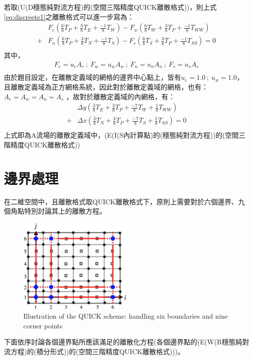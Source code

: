 \documentclass[12pt]{article}
\begin{document}
若取(U(D穩態純對流方程)的(空間三階精度QUICK離散格式))，則上式\eqref{eq:discreete1}之離散格式可以進一步寫為：
\begin{equation}\label{QUICK1}\begin{split}
    &F_{e}(\frac{6}{8}T_{P} + \frac{3}{8}T_{E} + \frac{-1}{8}T_{W}) - F_{w}(\frac{6}{8}T_{W} + \frac{3}{8}T_{P} + \frac{-1}{8}T_{WW}) \\[1.5ex] 
    + &F_{n}(\frac{6}{8}T_{P} + \frac{3}{8}T_{N} + \frac{-1}{8}T_{S}) - F_{s}(\frac{6}{8}T_{S} + \frac{3}{8}T_{P} + \frac{-1}{8}T_{SS}) = 0 \\[1.5ex]
\end{split}\end{equation}
其中，\begin{equation}\begin{split}
    F_{e} = u_{e}A_{e}\ ;\ F_{w} = u_{w}A_{w}\ ;\ F_{n} = u_{n}A_{n}\ ;\ F_{s} = u_{s}A_{s} \\[1.5ex]
\end{split}\end{equation}
由於題目設定，在離散定義域的網格的邊界中心點上，皆有$u_{e} = 1.0\ ;\ u_{w} = 1.0$，且離散定義域為正方網格系統，因此對於離散定義域的網格，也有：$A_{e} = A_{w} = A_{n} = A_{s}$
，故對於離散定義域的內網格，有：
\begin{equation}\label{eq:innerQUICK}\begin{split}
   &\Delta y (\frac{3}{8}T_{E} + \frac{3}{8}T_{P} +  \frac{-7}{8}T_{W}+ \frac{1}{8}T_{WW}) \\[1.5ex]
   +& \Delta x (\frac{3}{8}T_{N} + \frac{3}{8}T_{P} +  \frac{-7}{8}T_{S}+ \frac{1}{8}T_{SS}) = 0 \\[1.5ex]
\end{split}\end{equation}
上式即為A流場的離散定義域中，(E(I(S內計算點)的(穩態純對流方程))的(空間三階精度QUICK離散格式))
\section{邊界處理}
在二維空間中，且離散格式取QUICK離散格式下，原則上需要對於六個邊界、九個角點特別討論其上的離散方程。
\begin{figure}[H]
        \centering
        \includegraphics[width=0.5\textwidth]{13.png}
        \caption{Illustration of the QUICK scheme: handling six boundaries and nine corner points}
        \label{fig:QUICK_scheme_boundaries}
\end{figure}
\noindent 下面依序討論各個邊界點所應該滿足的離散化方程(各個邊界點的(E(W(R穩態純對流方程)的(積分形式))的(空間三階精度QUICK離散格式)))。
\end{document}
